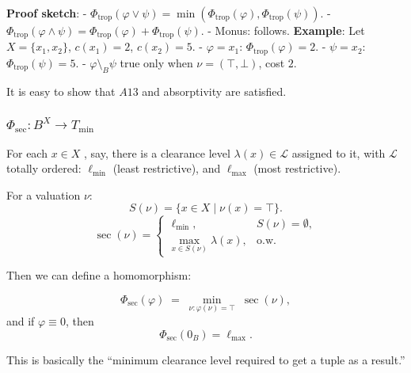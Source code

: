 \textbf{Proof sketch}: \newline
- \(\Phi_{\mathrm{trop}}(\varphi \vee \psi) = \min(\Phi_{\mathrm{trop}}(\varphi), \Phi_{\mathrm{trop}}(\psi))\).  
- \(\Phi_{\mathrm{trop}}(\varphi \wedge \psi) = \Phi_{\mathrm{trop}}(\varphi) + \Phi_{\mathrm{trop}}(\psi)\).  
- Monus: follows. \newline
\textbf{Example}: \newline
Let \(X=\{x_1,x_2\}\), \(c(x_1)=2\), \(c(x_2)=5\).  
- \(\varphi = x_1\): \(\Phi_{\mathrm{trop}}(\varphi)=2\).  
- \(\psi = x_2\): \(\Phi_{\mathrm{trop}}(\psi)=5\).  
- \(\varphi \setminus_B \psi\) true only when \(\nu=(\top,\bot)\), cost \(2\).

It is easy to show that $A13$ and absorptivity are satisfied.


\subsubsection{$\Phi_{\mathrm{sec}}: B^X \to T_{\min}$}

For each \(x\in X\) , say, there is a clearance level \(\lambda(x)\in \mathcal L\) assigned to it,
with \(\mathcal L\) totally ordered: \(\ell_{\min}\) (least restrictive),
and \(\ell_{\max}\) (most restrictive).

For a valuation \(\nu\):
\[
S(\nu) = \{x\in X \mid \nu(x)=\top\}.
\]
\[
\sec(\nu) =
\begin{cases}
\ell_{\min}, & S(\nu)=\emptyset,\\
\max_{x\in S(\nu)} \lambda(x), & \text{o.w.}
\end{cases}
\]



Then we can define a homomorphism:

\[
\Phi_{\mathrm{sec}}(\varphi)
\;=\;
\min_{\nu:\varphi(\nu)=\top}\;\sec(\nu),
\]
and if \(\varphi\equiv 0\), then
\[
\Phi_{\mathrm{sec}}(0_B) = \ell_{\max}.
\]

This is basically the “minimum clearance level required to get a tuple as a result.”



